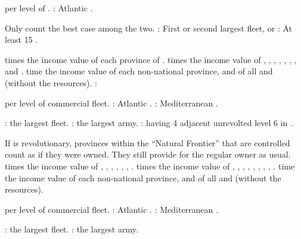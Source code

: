 \aparag[Trade.]
 \VP per level of .
 \VPs: Atlantic .

\aparag[Military.] Only count the best case among the two.
 \VPs: First or second largest fleet, or
 \VPs: At least 15 \NWD.

\aparag[Territory]
 times the income value of each province of .
 times the income value of ,
, , ,
, , ,
and .
 time the income value of each non-national province, and of
all \COL and \TP (without the resources).
 \VPs: 

\aparag[Trade.]
 \VP per level of commercial fleet.
 \VPs: Atlantic .
 \VPs: Mediterranean .

\aparag[Military.]
 \VPs: the largest fleet.
 \VPs: the largest army.
 \VPs: having 4 adjacent unrevolted level 6 \COL in
.

\aparag[Territory.]
\bparag If \FRA is revolutionary, provinces within the ``Natural
Frontier'' that are controlled count as if they were owned. They still
provide \VPs for the regular owner as usual.
 times the income value of ,
, , ,
, , .
 times the income value of ,
, , ,
, ,
, ,
.
 time the income value of each non-national province, and of
all \COL and \TP (without the resources).

\aparag[Trade.]
 \VP per level of commercial fleet.
 \VPs: Atlantic .
 \VPs: Mediterranean .

\aparag[Military.]
 \VPs: the largest fleet.
 \VPs: the largest army.

